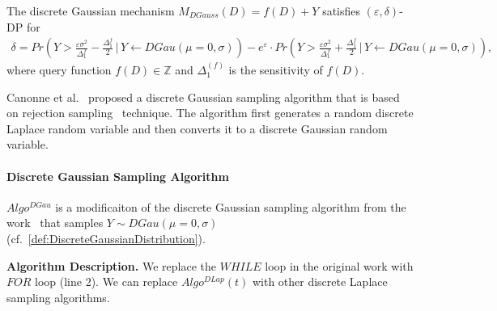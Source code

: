 \begin{theorem}
    The discrete Gaussian mechanism $M_{DGauss}\left(D\right)=f\left(D\right)+Y$ satisfies $\left(\varepsilon,\delta\right) $-DP for
    \begin{equation}
        \begin{split}
            \delta = Pr\left(Y > \frac{\varepsilon \sigma^2}{\Delta_1^{f}}-\frac{\Delta_1^{f}}{2}\,|\,Y\gets DGau\left(\mu=0,\sigma\right) \right)-e^{\varepsilon} \cdot Pr\left(Y > \frac{\varepsilon \sigma^2}{\Delta_1^{f}}+\frac{\Delta_1^{f}}{2}\,|\,Y\gets DGau\left(\mu=0,\sigma\right) \right),
        \end{split}
    \end{equation}
    where query function $f\left(D\right)\in\mathbb{Z} $ and $\Delta_1^{\left(f\right) }$ is the sensitivity of $f\left(D\right) $.
\end{theorem}

Canonne et al.~\cite{canonne2020discrete} proposed a discrete Gaussian sampling algorithm that is based on rejection sampling~\cite{casella2004generalized} technique. The algorithm first generates a random discrete Laplace random variable and then converts it to a discrete Gaussian random variable.



\paragraph{Discrete Gaussian Sampling Algorithm}
\label{para:DiscreteGaussianSamplingAlgorithm}
$Algo^{DGau}$ is a modificaiton of the discrete Gaussian sampling algorithm from the work~\cite{canonne2020discrete} that samples $Y\sim DGau\left( \mu=0,\sigma\right)$ (cf.~\autoref{def:DiscreteGaussianDistribution}).

\textbf{Algorithm Description. }
We replace the $WHILE$ loop in the original work with $FOR$ loop (line 2).
We can replace $Algo^{DLap}\left(t\right) $ with other discrete Laplace sampling algorithms.

